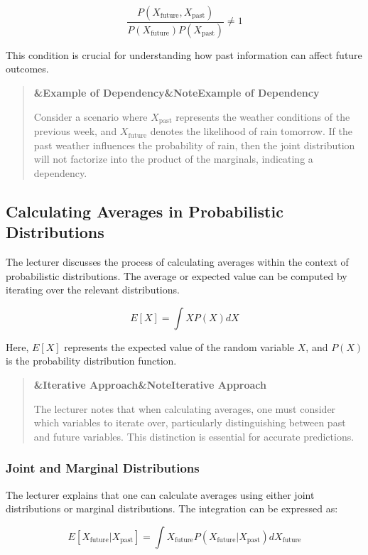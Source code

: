 \documentclass[a4paper]{article}
\newcommand{\boxheading}[1]{%
  \par\smallskip
  \noindent\textbf{\ifx&#1&Note\else#1\fi}\par
  \smallskip
}
\newenvironment{exbox}[1][]{%
  \begin{quote}\color{brown!70!black}\boxheading{#1}\normalcolor
}{\end{quote}}
\newenvironment{rembox}[1][]{%
  \begin{quote}\color{black!70}\boxheading{#1}\normalcolor
}{\end{quote}}
\begin{document}
\begin{equation}
\frac{P(X_{\text{future}}, X_{\text{past}})}{P(X_{\text{future}}) P(X_{\text{past}})} \neq 1
\end{equation}

This condition is crucial for understanding how past information can affect future outcomes.

\begin{exbox}[Example of Dependency]
Consider a scenario where \( X_{\text{past}} \) represents the weather conditions of the previous week, and \( X_{\text{future}} \) denotes the likelihood of rain tomorrow. If the past weather influences the probability of rain, then the joint distribution will not factorize into the product of the marginals, indicating a dependency.
\end{exbox}

\subsection{Calculating Averages in Probabilistic Distributions}
The lecturer discusses the process of calculating averages within the context of probabilistic distributions. The average or expected value can be computed by iterating over the relevant distributions.

\begin{equation}
E[X] = \int X P(X) dX
\end{equation}

Here, \( E[X] \) represents the expected value of the random variable \( X \), and \( P(X) \) is the probability distribution function.

\begin{rembox}[Iterative Approach]
The lecturer notes that when calculating averages, one must consider which variables to iterate over, particularly distinguishing between past and future variables. This distinction is essential for accurate predictions.
\end{rembox}

\subsubsection{Joint and Marginal Distributions}
The lecturer explains that one can calculate averages using either joint distributions or marginal distributions. The integration can be expressed as:

\begin{equation}
E[X_{\text{future}} | X_{\text{past}}] = \int X_{\text{future}} P(X_{\text{future}} | X_{\text{past}}) dX_{\text{future}}
\end{equation}
\end{document}
